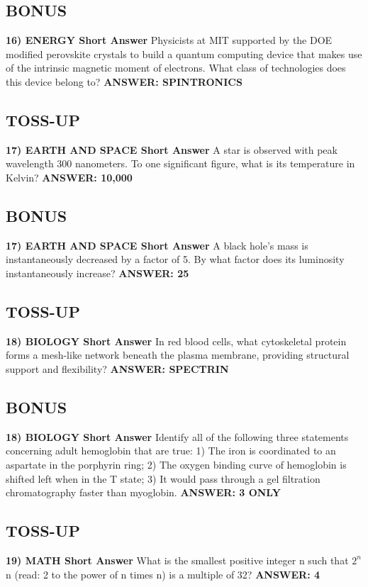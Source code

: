 \documentclass{article}
\begin{document}
\subsection*{BONUS}
\textbf{16) ENERGY Short Answer} Physicists at MIT supported by the DOE modified perovskite crystals to build a quantum computing device that makes use of the intrinsic magnetic moment of electrons. What class of technologies does this device belong to?
\textbf{ANSWER: SPINTRONICS}

\subsection*{TOSS-UP}
\textbf{17) EARTH AND SPACE Short Answer} A star is observed with peak wavelength 300 nanometers. To one significant figure, what is its temperature in Kelvin?
\textbf{ANSWER: 10,000}

\subsection*{BONUS}
\textbf{17) EARTH AND SPACE Short Answer} A black hole's mass is instantaneously decreased by a factor of 5. By what factor does its luminosity instantaneously increase?
\textbf{ANSWER: 25}

\newpage

\subsection*{TOSS-UP}
\textbf{18) BIOLOGY Short Answer} In red blood cells, what cytoskeletal protein forms a mesh-like network beneath the plasma membrane, providing structural support and flexibility?
\textbf{ANSWER: SPECTRIN}

\subsection*{BONUS}
\textbf{18) BIOLOGY Short Answer} Identify all of the following three statements concerning adult hemoglobin that are true: 1) The iron is coordinated to an aspartate in the porphyrin ring; 2) The oxygen binding curve of hemoglobin is shifted left when in the T state; 3) It would pass through a gel filtration chromatography faster than myoglobin.
\textbf{ANSWER: 3 ONLY}

\subsection*{TOSS-UP}
\textbf{19) MATH Short Answer} What is the smallest positive integer n such that $2^{n}$ n (read: 2 to the power of n times n) is a multiple of 32?
\textbf{ANSWER: 4}
\end{document}
